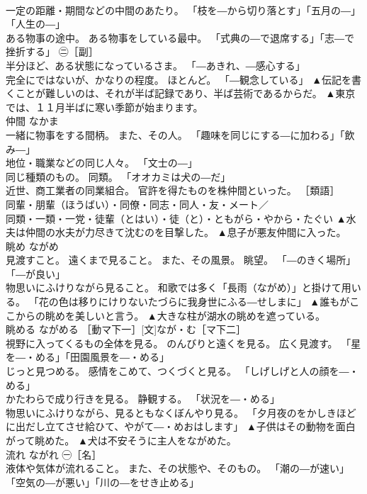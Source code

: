 \documentclass[8pt]{extreport}
\begin{document}
\begin{CJK}{UTF8}{min}
\\	一定の距離・期間などの中間のあたり。 「枝を―から切り落とす」「五月の―」「人生の―」 
\\	ある物事の途中。 ある物事をしている最中。 「式典の―で退席する」「志―で挫折する」 ㊁［副］ 
\\	半分ほど、ある状態になっているさま。 「―あきれ、―感心する」 
\\	完全にではないが、かなりの程度。 ほとんど。 「―観念している」	▲伝記を書くことが難しいのは、それが半ば記録であり、半ば芸術であるからだ。 ▲東京では、１１月半ばに寒い季節が始まります。
\\	仲間	なかま	
\\	一緒に物事をする間柄。 また、その人。 「趣味を同じにする―に加わる」「飲み―」 
\\	地位・職業などの同じ人々。 「文士の―」 
\\	同じ種類のもの。 同類。 「オオカミは犬の―だ」 
\\	近世、商工業者の同業組合。 官許を得たものを株仲間といった。 ［類語］
\\	同輩・朋輩（ほうばい）・同僚・同志・同人・友・メート／
\\	同類・一類・一党・徒輩（とはい）・徒（と）・ともがら・やから・たぐい	▲水夫は仲間の水夫が力尽きて沈むのを目撃した。 ▲息子が悪友仲間に入った。
\\	眺め	ながめ	
\\	見渡すこと。 遠くまで見ること。 また、その風景。 眺望。 「―のきく場所」「―が良い」 
\\	物思いにふけりながら見ること。 和歌では多く「長雨（ながめ）」と掛けて用いる。 「花の色は移りにけりないたづらに我身世にふる―せしまに」	▲誰もがここからの眺めを美しいと言う。 ▲大きな柱が湖水の眺めを遮っている。
\\	眺める	ながめる	［動マ下一］[文]なが・む［マ下二］ 
\\	視野に入ってくるもの全体を見る。 のんびりと遠くを見る。 広く見渡す。 「星を―・める」「田園風景を―・める」 
\\	じっと見つめる。 感情をこめて、つくづくと見る。 「しげしげと人の顔を―・める」 
\\	かたわらで成り行きを見る。 静観する。 「状況を―・める」 
\\	物思いにふけりながら、見るともなくぼんやり見る。 「夕月夜のをかしきほどに出だし立てさせ給ひて、やがて―・めおはします」	▲子供はその動物を面白がって眺めた。 ▲犬は不安そうに主人をながめた。
\\	流れ	ながれ	㊀［名］ 
\\	液体や気体が流れること。 また、その状態や、そのもの。 「潮の―が速い」「空気の―が悪い」「川の―をせき止める」 

\end{CJK}
\end{document}
